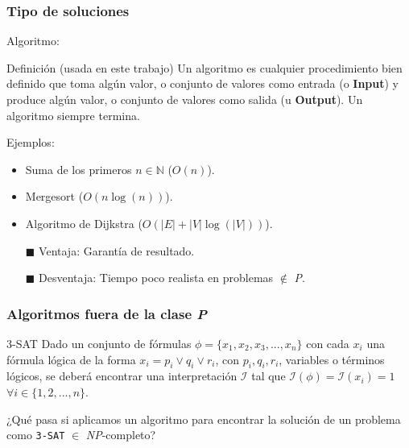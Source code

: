\begin{frame}
\frametitle{Tipo de soluciones}

Algoritmo:
\begin{block}{Definición (usada en este trabajo)}
 Un algoritmo es cualquier procedimiento bien
definido que toma algún valor, o conjunto de valores como entrada
(o \textbf{Input}) y produce algún valor, o conjunto de valores como
salida (u \textbf{Output}). Un algoritmo siempre termina.
\end{block}

\pause

Ejemplos: 

\begin{itemize}
\item Suma de los primeros $n \in \mathbb{N}$ ($O(n)$).
\item Mergesort ($O(n\log(n))$).
\item Algoritmo de Dijkstra ($O(|E| + |V|\log(|V|))$).
\end{itemize}

\pause

\begin{itemize}
		\item[$\blacksquare$] Ventaja: Garantía de resultado.
		\item[$\blacksquare$] Desventaja: Tiempo poco realista en problemas $\notin$ \textsl{P}.
\end{itemize}

\end{frame}


\begin{frame}
\frametitle{Algoritmos fuera de la clase \textsl{P}}

\begin{block}{3-SAT}
Dado un conjunto de fórmulas
$\phi = \{x_{1}, x_{2}, x_{3}, ..., x_{n}\}$ con cada $x_{i}$ una fórmula lógica
de la forma $x_{i} = p_{i} \lor q_{i} \lor r_{i} $, con $ p_{i}, q_{i}, r_{i}$,
variables o términos lógicos, se deberá encontrar una
interpretación $\mathcal{I}$ tal que $\mathcal{I}(\phi) = \mathcal{I}(x_{i}) = 1$
$\forall i \in \{1,2,...,n\}$.
\end{block}
\pause
¿Qué pasa si aplicamos un algoritmo para encontrar la solución de un problema como \texttt{3-SAT} $\in$ \textsl{NP}-completo?

\begin{columns}
\begin{figure}[h]
\scalebox{.4}{}
\end{figure} 

\begin{figure}
\scalebox{.4}{}
\end{figure}

\end{columns}
\end{frame}
